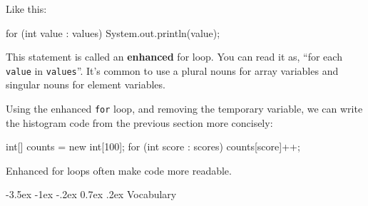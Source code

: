 \documentclass[12pt]{book}
\makeatletter
\theoremstyle{exercise}
\newcommand{\java}[1]{\verb"#1"}
\renewcommand{\section}{\@startsection{section}{1}{\z@}%
    {-3.5ex \@plus -1ex \@minus -.2ex}%
    {0.7ex \@plus.2ex}%
    {\normalfont\Large\bfseries}}
\newcommand{\java}[1]{\lstinline{#1}} %
\makeatother
\begin{document}
Like this:

\begin{code}
    for (int value : values) {
        System.out.println(value);
    }
\end{code}

This statement is called an {\bf enhanced} for loop.
You can read it as, ``for each \java{value} in \java{values}''.
It's common to use a plural nouns for array variables and singular nouns for element variables.

Using the enhanced \java{for} loop, and removing the temporary variable, we can write the histogram code from the previous section more concisely:

\begin{code}
    int[] counts = new int[100];
    for (int score : scores) {
        counts[score]++;
    }
\end{code}

Enhanced for loops often make code more readable.



\section{Vocabulary}
\end{document}
